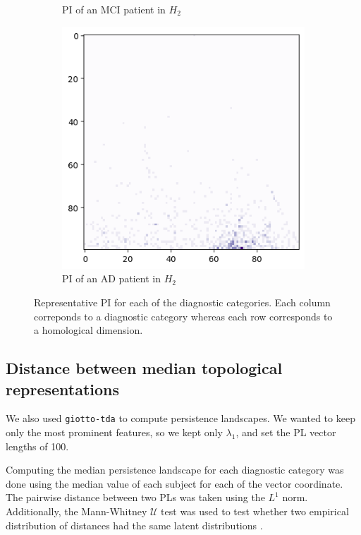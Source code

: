 \documentclass{article}
\begin{document}
\begin{figure}
\begin{subfigure}{0.32\textwidth}
    \caption{PI of an MCI patient in $H_2$}
  \end{subfigure}
  \begin{subfigure}{0.32\textwidth}
    \includegraphics[width=\textwidth]{figures/PIs/Persistence_image_AD_h_2.png}
    \caption{PI of an AD patient in $H_2$}
  \end{subfigure}
  \caption{Representative PI for each of the diagnostic categories. Each column correponds to a
    diagnostic category whereas each row corresponds to a homological dimension.}
  \label{fig:sample_rep_pi}
\end{figure}

\subsection{Distance between median topological representations}

We also used \texttt{giotto-tda} to compute persistence landscapes. We wanted to keep only the most
prominent features, so we kept only $\lambda_1$, and set the PL vector lengths of 100.

Computing the median persistence landscape for each diagnostic category was done using the median
value of each subject for each of the vector coordinate. The pairwise distance between two PLs was
taken using the $L^1$ norm. Additionally, the Mann-Whitney $\mathcal{U}$ test
was used to test whether two empirical distribution of distances had the same
latent distributions \citep{mann1947test}.
\end{document}
